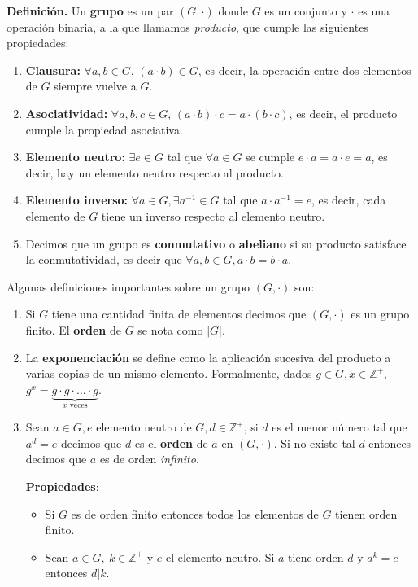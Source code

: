 \textbf{Definición.} Un \textbf{grupo} es un par $(G, \cdot)$ donde $G$ es un conjunto y $\cdot$ es una operación binaria, a la que llamamos \textit{producto}, que cumple las siguientes propiedades:
\begin{enumerate}
    \item \textbf{Clausura:} $\forall a,b \in G$, $(a \cdot b) \in G$, es decir, la operación entre dos elementos de $G$ siempre vuelve a $G$.
    \item \textbf{Asociatividad:} $\forall a,b,c \in G$, $(a \cdot b)\cdot c = a \cdot (b \cdot c)$, es decir, el producto cumple la propiedad asociativa. 
    \item \textbf{Elemento neutro:} $\exists e \in G$ tal que $\forall a \in G$ se cumple $e \cdot a = a \cdot e = a$, es decir, hay un elemento neutro respecto al producto. 
    \item \textbf{Elemento inverso: } $\forall a \in G, \exists a^{-1} \in G$ tal que $a \cdot a^{-1} = e$, es decir, cada elemento de $G$ tiene un inverso respecto al elemento neutro.
    \item Decimos que un grupo es \textbf{conmutativo} o \textbf{abeliano} si su producto satisface la conmutatividad, es decir que $\forall a,b \in G, a \cdot b = b \cdot a$.
\end{enumerate}


Algunas definiciones importantes sobre un grupo $(G, \cdot)$ son:
\begin{enumerate}
    \item Si $G$ tiene una cantidad finita de elementos decimos que $(G, \cdot)$ es un grupo finito. El \textbf{orden} de $G$ se nota como $|G|$.
    \item La \textbf{exponenciación} se define como la aplicación sucesiva del producto a varias copias de un mismo elemento. Formalmente, dados $g \in G, x \in \mathbb{Z}^+$, $g^x = \underbrace{g \cdot g \cdot ... \cdot g}_{x \text{ veces}}$.
    \item Sean $a \in G, e \text{ elemento neutro de }G, d \in \mathbb{Z}^+$, si $d$ es el menor número tal que $a^d = e$ decimos que $d$ es el \textbf{orden} de $a$ en $(G, \cdot)$. Si no existe tal $d$ entonces decimos que $a$ es de orden \textit{infinito}.
    
    \textbf{Propiedades}:
    \begin{itemize}
        \item Si $G$ es de orden finito entonces todos los elementos de $G$ tienen orden finito. 
        \item \label{prop:division_de_orden} Sean $a \in G,~ k \in \mathbb{Z}^+$ y $e$ el elemento neutro. Si $a$ tiene orden $d$ y $a^k = e$ entonces $d|k$. 
    \end{itemize}
\end{enumerate}

